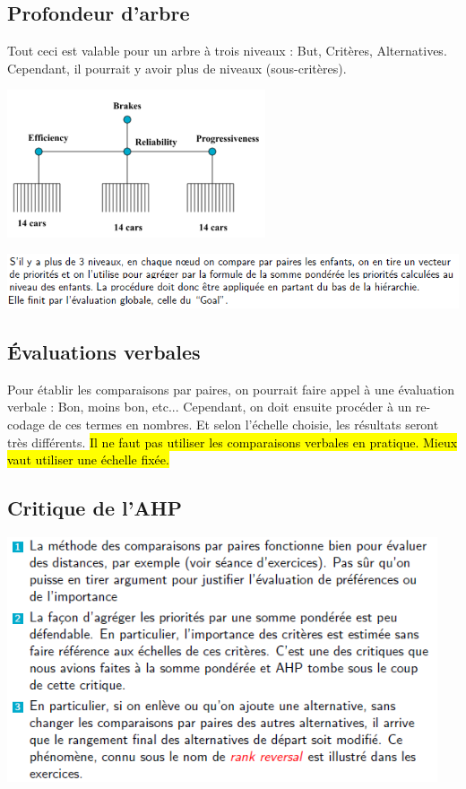\documentclass[a4paper, 12pt]{article}
\newcommand{\alinea}{
\hspace*{0.5cm}}
\begin{document}
	\subsection{Profondeur d'arbre}
		\alinea Tout ceci est valable pour un arbre à trois niveaux : But, Critères, Alternatives. Cependant, il pourrait
			y avoir plus de niveaux (sous-critères).
			\begin{center}
				\includegraphics[width=3in]{Images/ahp3}
			\end{center}
	\begin{center}
		\includegraphics[width=\textwidth]{Images/ahp4}
	\end{center}
	\subsection{\'Evaluations verbales}
		\alinea Pour établir les comparaisons par paires, on pourrait faire appel à une évaluation verbale : Bon, moins bon, etc...
			Cependant, on doit ensuite procéder à un re-codage de ces termes en nombres. Et selon l'échelle choisie, les résultats seront
			très différents. \hl{Il ne faut pas utiliser les comparaisons verbales en pratique. Mieux vaut utiliser une échelle fixée.}
	\subsection{Critique de l'AHP}
		\begin{center}
			\includegraphics[width=5in]{Images/ahp5}
		\end{center}
%
\end{document}
